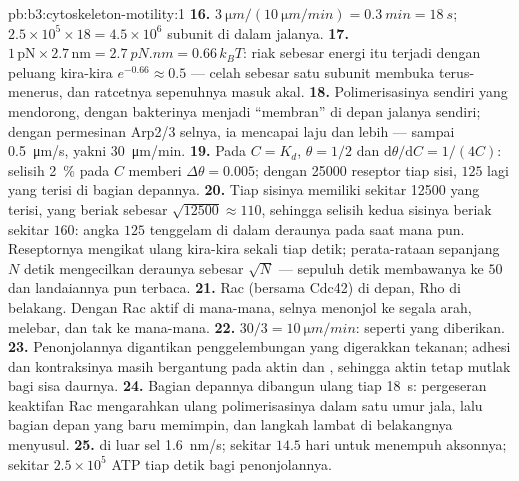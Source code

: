 \begin{solution}{pb:b3:cytoskeleton-motility:1}
\textbf{16.} $\qty{3}{\micro m}/(\qty{10}{\micro m/min}) = \qty{0.3}{min}
= \qty{18}{s}$; $2.5\times 10^{5}\times 18 = 4.5\times 10^{6}$ subunit
di dalam jalanya.
\textbf{17.} $1\,\text{pN}\times 2.7\,\text{nm} = \qty{2.7}{pN.nm} =
0.66\,k_{B}T$: riak sebesar energi itu terjadi dengan peluang
kira-kira $e^{-0.66} \approx 0.5$ --- celah sebesar satu subunit membuka
terus-menerus, dan ratcetnya sepenuhnya masuk akal.
\textbf{18.} Polimerisasinya sendiri yang mendorong, dengan bakterinya
menjadi ``membran'' di depan jalanya sendiri; dengan permesinan Arp2/3 selnya,
ia mencapai laju  dan lebih --- sampai
\qty{0.5}{\micro m/s}, yakni \qty{30}{\micro m/min}.
\textbf{19.} Pada $C = K_{d}$, $\theta = 1/2$ dan $\mathrm{d}\theta/
\mathrm{d}C = 1/(4C)$: selisih \qty{2}{\%} pada $C$ memberi $\Delta\theta
= 0.005$; dengan \num{25000} reseptor tiap sisi, $125$ lagi yang terisi di
bagian depannya.
\textbf{20.} Tiap sisinya memiliki sekitar \num{12500} yang terisi, yang
beriak sebesar $\sqrt{\num{12500}} \approx 110$, sehingga selisih kedua
sisinya beriak sekitar $160$: angka $125$ tenggelam di dalam deraunya pada
saat mana pun. Reseptornya mengikat ulang kira-kira sekali tiap detik;
perata-rataan sepanjang $N$ detik mengecilkan deraunya sebesar $\sqrt{N}$ ---
sepuluh detik membawanya ke $50$ dan landaiannya pun terbaca.
\textbf{21.} Rac (bersama Cdc42) di depan, Rho di belakang. Dengan
Rac aktif di mana-mana, selnya menonjol ke segala arah, melebar, dan tak ke mana-mana.
\textbf{22.} $30/3 = \qty{10}{\micro m/min}$: seperti yang diberikan.
\textbf{23.} Penonjolannya digantikan penggelembungan yang digerakkan tekanan;
adhesi dan kontraksinya masih bergantung pada aktin dan , sehingga aktin
tetap mutlak bagi sisa daurnya.
\textbf{24.} Bagian depannya dibangun ulang tiap \qty{18}{s}: pergeseran
keaktifan Rac mengarahkan ulang polimerisasinya dalam satu umur jala, lalu
bagian depan yang baru memimpin, dan langkah lambat di belakangnya menyusul.
\textbf{25.}  di luar sel \qty{1.6}{nm/s}; sekitar $14.5$ hari
untuk menempuh aksonnya; sekitar $2.5\times 10^{5}$ ATP tiap detik bagi
penonjolannya.
\end{solution}
